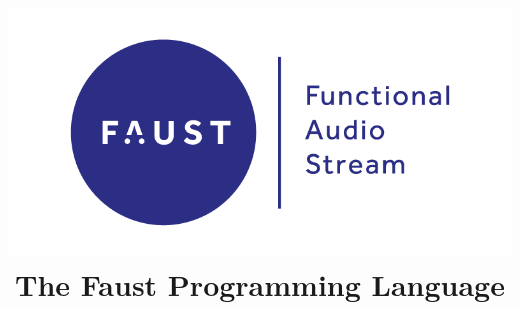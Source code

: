 
\title{\includegraphics[height=.4\textheight]{images/logo-faust}\\The Faust Programming Language}
\author{}

\date{}

\frame{\titlepage}
